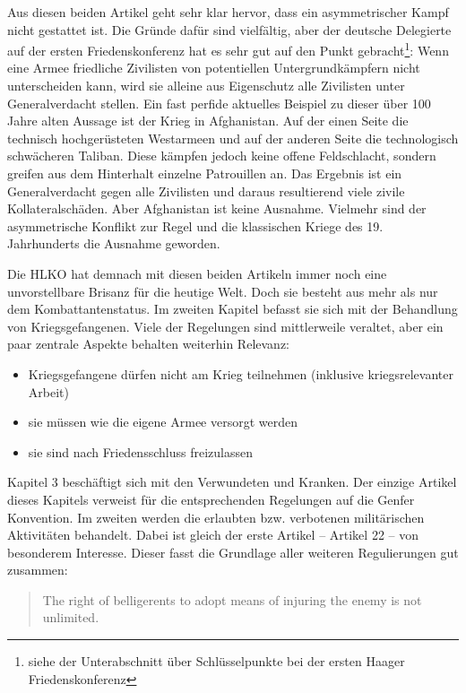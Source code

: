 \documentclass[12pt]{scrartcl}
\begin{document}
Aus diesen beiden Artikel geht sehr klar hervor, dass ein asymmetrischer Kampf nicht gestattet ist. Die Gründe dafür sind vielfältig, aber der deutsche Delegierte auf der ersten Friedenskonferenz hat es sehr gut auf den Punkt gebracht\footnote{siehe der Unterabschnitt über Schlüsselpunkte bei der ersten Haager Friedenskonferenz}: Wenn eine Armee friedliche Zivilisten von potentiellen Untergrundkämpfern nicht unterscheiden kann, wird sie alleine aus Eigenschutz alle Zivilisten unter Generalverdacht stellen. Ein fast perfide aktuelles Beispiel zu dieser über 100 Jahre alten Aussage ist der Krieg in Afghanistan. Auf der einen Seite die technisch hochgerüsteten Westarmeen und auf der anderen Seite die technologisch schwächeren Taliban. Diese kämpfen jedoch keine offene Feldschlacht, sondern greifen aus dem Hinterhalt einzelne Patrouillen an. Das Ergebnis ist ein Generalverdacht gegen alle Zivilisten und daraus resultierend viele zivile Kollateralschäden. Aber Afghanistan ist keine Ausnahme. Vielmehr sind der asymmetrische Konflikt zur Regel und die klassischen Kriege des 19. Jahrhunderts die Ausnahme geworden.

Die HLKO hat demnach mit diesen beiden Artikeln immer noch eine unvorstellbare Brisanz für die heutige Welt. Doch sie besteht aus mehr als nur dem Kombattantenstatus. Im zweiten Kapitel befasst sie sich mit der Behandlung von Kriegsgefangenen.\cite{Scott-V1-1921} Viele der Regelungen sind mittlerweile veraltet, aber ein paar zentrale Aspekte behalten weiterhin Relevanz:

\begin{itemize}
	\item Kriegsgefangene dürfen nicht am Krieg teilnehmen (inklusive kriegsrelevanter Arbeit)
	\item sie müssen wie die eigene Armee versorgt werden
	\item sie sind nach Friedensschluss freizulassen
\end{itemize}

Kapitel 3 beschäftigt sich mit den Verwundeten und Kranken. Der einzige Artikel dieses Kapitels verweist für die entsprechenden Regelungen auf die Genfer Konvention. Im zweiten werden die erlaubten bzw. verbotenen militärischen Aktivitäten behandelt. Dabei ist gleich der erste Artikel -- Artikel 22 -- von besonderem Interesse. Dieser fasst die Grundlage aller weiteren Regulierungen gut zusammen:

\begin{quotation}
	The right of belligerents to adopt means of injuring the enemy is not unlimited.
\end{quotation}
\end{document}
